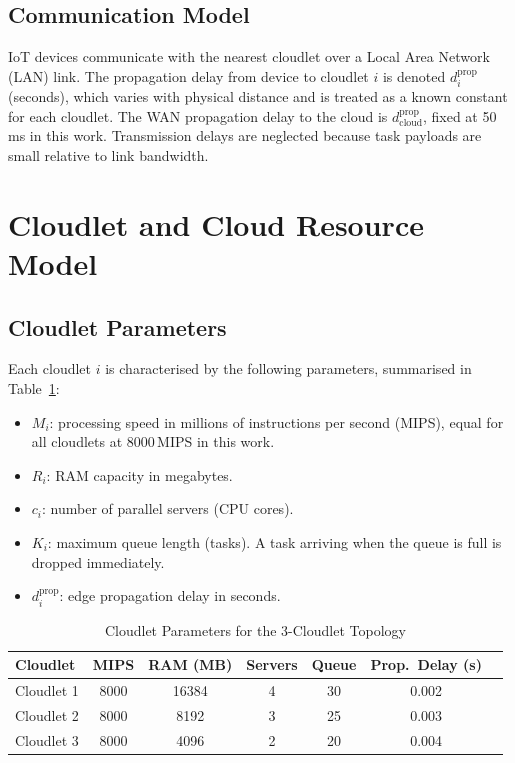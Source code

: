 \subsection{Communication Model}

IoT devices communicate with the nearest cloudlet over a Local
Area Network (LAN) link. The propagation delay from device to
cloudlet $i$ is denoted $d_i^{\text{prop}}$ (seconds), which
varies with physical distance and is treated as a known constant
for each cloudlet. The WAN propagation delay to the cloud is
$d_{\text{cloud}}^{\text{prop}}$, fixed at 50\,ms in this work.
Transmission delays are neglected because task payloads are small
relative to link bandwidth.

\section{Cloudlet and Cloud Resource Model}
\label{sec:resource_model}

\subsection{Cloudlet Parameters}

Each cloudlet $i$ is characterised by the following parameters,
summarised in Table~\ref{tab:cloudlet_params}:

\begin{itemize}
  \item $M_i$: processing speed in millions of instructions per
  second (MIPS), equal for all cloudlets at 8000\,MIPS in this
  work.
  \item $R_i$: RAM capacity in megabytes.
  \item $c_i$: number of parallel servers (CPU cores).
  \item $K_i$: maximum queue length (tasks). A task arriving when
  the queue is full is dropped immediately.
  \item $d_i^{\text{prop}}$: edge propagation delay in seconds.
\end{itemize}

\begin{table}[htbp]
\centering
\caption{Cloudlet Parameters for the 3-Cloudlet Topology}
\label{tab:cloudlet_params}
\renewcommand{\arraystretch}{1.15}
\begin{tabular}{lcccccc}
\toprule
\textbf{Cloudlet} & \textbf{MIPS} & \textbf{RAM (MB)} &
\textbf{Servers} & \textbf{Queue} &
\textbf{Prop.\ Delay (s)} \\
\midrule
Cloudlet 1 & 8000 & 16384 & 4 & 30 & 0.002 \\
Cloudlet 2 & 8000 & 8192  & 3 & 25 & 0.003 \\
Cloudlet 3 & 8000 & 4096  & 2 & 20 & 0.004 \\
\bottomrule
\end{tabular}
\end{table}

